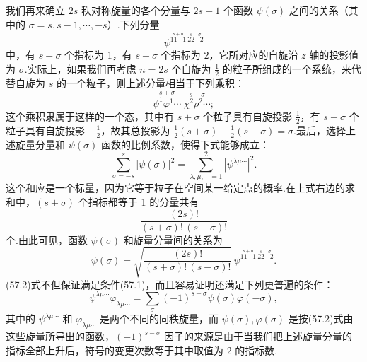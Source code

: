 我们再来确立 $2s$ 秩对称旋量的各个分量与 $2s+1$ 个函数 $\psi(\sigma)$ 之间的关系（其中的 $\sigma=s,s-1,\cdots,-s$）.下列分量
\begin{equation*}
  \psi^{\overset{s+\sigma}{11\cdots1}\ \overset{s-\sigma}{22\cdots2}}
\end{equation*}
中，有 $s+\sigma$ 个指标为 1，有 $s-\sigma$ 个指标为 2，它所对应的自旋沿 $z$ 轴的投影值为 $\sigma$.实际上，如果我们再考虑 $n=2s$ 个自旋为 $\frac{1}{2}$ 的粒子所组成的一个系统，来代替自旋为 $s$ 的一个粒子，则上述分量相当于下列乘积：
\begin{equation*}
  \overset{s+\sigma}{\psi^1\varphi^1\cdots}\ \overset{s-\sigma}{\chi^2\rho^2\cdots};
\end{equation*}
这个乘积隶属于这样的一个态，其中有 $s+\sigma$ 个粒子具有自旋投影 $\frac{1}{2}$，有 $s-\sigma$ 个粒子具有自旋投影 $-\frac{1}{2}$，故其总投影为 $\frac{1}{2}(s+\sigma)-\frac{1}{2}(s-\sigma)=\sigma$.最后，选择上述旋量分量和 $\psi(\sigma)$ 函数的比例系数，使得下式能够成立：
\begin{equation}
  \sum_{\sigma=-s}^{s}|\psi(\sigma)|^2
  =\sum_{\lambda,\mu,\cdots=1}^{2}\left|\psi^{\lambda\mu\cdots}\right|^2.
\end{equation}
这个和应是一个标量，因为它等于粒子在空间某一给定点的概率.在上式右边的求和中，$(s+\sigma)$ 个指标都等于 1 的分量共有
\begin{equation*}
  \frac{(2s)!}{(s+\sigma)!\,(s-\sigma)!}
\end{equation*}
个.由此可见，函数 $\psi(\sigma)$ 和旋量分量间的关系为
\begin{equation}
  \psi(\sigma)=\sqrt{\frac{(2s)!}{(s+\sigma)!\,(s-\sigma)!}}\,
  \psi^{\overset{s+\sigma}{11\cdots1}\ \overset{s-\sigma}{22\cdots2}}.
\end{equation}
(57.2)式不但保证满足条件(57.1)，而且容易证明还满足下列更普遍的条件：
\begin{equation}
  \psi^{\lambda\mu\cdots}\varphi_{\lambda\mu\cdots}
  =\sum_{\sigma}(-1)^{s-\sigma}\psi(\sigma)\varphi(-\sigma),
\end{equation}
其中的 $\psi^{\lambda\mu\cdots}$ 和 $\varphi_{\lambda\mu\cdots}$ 是两个不同的同秩旋量，而 $\psi(\sigma),\varphi(\sigma)$ 是按(57.2)式由这些旋量所导出的函数，$(-1)^{s-\sigma}$ 因子的来源是由于当我们把上述旋量分量的指标全部上升后，符号的变更次数等于其中取值为 2 的指标数.

